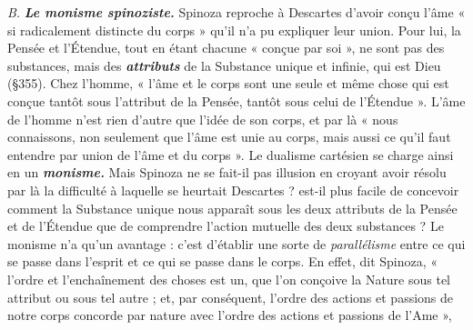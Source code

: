 {\it B.} \textbf{\textit {Le monisme spinoziste.}} Spinoza reproche à Descartes d’avoir
conçu l’âme « si radicalement distincte du corps » qu’il n’a pu expliquer
leur union. Pour lui, la Pensée et l’Étendue, tout en étant chacune
« conçue par soi », ne sont pas des substances, mais des \textbf{\textit {attributs}}
de la Substance unique et infinie, qui est Dieu (\S 355). Chez l’homme,
« l’âme et le corps sont une seule et même chose qui est conçue tantôt
sous l’attribut de la Pensée, tantôt sous celui de l’Étendue ». L'âme
de l’homme n’est rien d’autre que l’idée de son corps, et par là « nous
connaissons, non seulement que l’âme est unie au corps, mais aussi
ce qu’il faut entendre par union de l’âme et du corps ». Le dualisme
cartésien se charge ainsi en un \textbf{\textit {monisme.}} Mais Spinoza ne se fait-il pas
illusion en croyant avoir résolu par là la difficulté à laquelle se heurtait
Descartes ? est-il plus facile de concevoir comment la Substance
unique nous apparaît sous les deux attributs de la Pensée et de
l’Étendue que de comprendre l’action mutuelle des deux substances ?
Le monisme n’a qu’un avantage : c’est d'établir une sorte de {\it parallélisme}
entre ce qui se passe dans l'esprit et ce qui se passe dans le
corps. En effet, dit Spinoza, « l’ordre et l’enchaînement des choses
est un, que l’on conçoive la Nature sous tel attribut ou sous tel autre ;
et, par conséquent, l’ordre des actions et passions de notre corps
concorde par nature avec l’ordre des actions et passions de l’Ame »,

